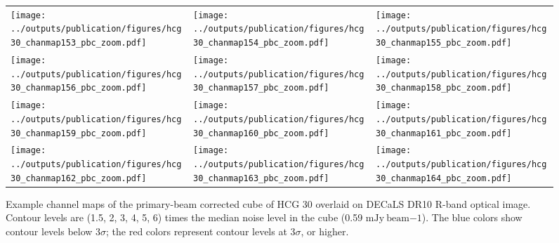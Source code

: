 \documentclass{aa}
\newcommand{\HI}{H\,{\sc i}}
\begin{document}
\begin{figure*}
    \setlength{\tabcolsep}{0pt}
    \begin{tabular}{l l l}
        \texttt{[image: ../outputs/publication/figures/hcg30\_chanmap153\_pbc\_zoom.pdf]} &
        \texttt{[image: ../outputs/publication/figures/hcg30\_chanmap154\_pbc\_zoom.pdf]} &
        \texttt{[image: ../outputs/publication/figures/hcg30\_chanmap155\_pbc\_zoom.pdf]} \\[-0.2cm]
        \texttt{[image: ../outputs/publication/figures/hcg30\_chanmap156\_pbc\_zoom.pdf]} &
        \texttt{[image: ../outputs/publication/figures/hcg30\_chanmap157\_pbc\_zoom.pdf]} &
        \texttt{[image: ../outputs/publication/figures/hcg30\_chanmap158\_pbc\_zoom.pdf]}\\[-0.2cm]
        \texttt{[image: ../outputs/publication/figures/hcg30\_chanmap159\_pbc\_zoom.pdf]} &
        \texttt{[image: ../outputs/publication/figures/hcg30\_chanmap160\_pbc\_zoom.pdf]} & 
        \texttt{[image: ../outputs/publication/figures/hcg30\_chanmap161\_pbc\_zoom.pdf]}\\[-0.2cm]
        \texttt{[image: ../outputs/publication/figures/hcg30\_chanmap162\_pbc\_zoom.pdf]} &
        \texttt{[image: ../outputs/publication/figures/hcg30\_chanmap163\_pbc\_zoom.pdf]} &
        \texttt{[image: ../outputs/publication/figures/hcg30\_chanmap164\_pbc\_zoom.pdf]}
      \end{tabular}
      \caption{Example channel maps of the primary-beam corrected cube of HCG 30 overlaid on DECaLS DR10 R-band optical image. Contour levels are (1.5, 2, 3, 4, 5, 6) times 
      the median noise level in the cube (0.59 $\mathrm{mJy~beam{-1}}$). The blue colors show contour levels below 3$\sigma$; the red colors represent contour levels at 3$\sigma$, or higher.}
      \label{fig:hcg30_chanmap}
     \end{figure*}

\end{document}
